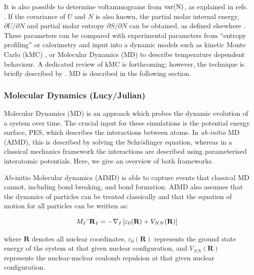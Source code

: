\documentclass[../main.tex]{subfiles}
\begin{document}
It is also possible to determine voltammograms from $\rm{var}(N)$, as explained in refs. \cite{mercer_influence_2017,darling1999}. If the covariance of $U$ and $N$ is also known, the partial molar internal energy, $\partial{U}/\partial{N}$ and partial molar entropy $\partial{S}/\partial{N}$ can be obtained, as defined elsewhere \cite{mercer_influence_2017,Kim2001h}. These parameters can be compared with experimental parameters from ``entropy profiling'' or calorimetry \cite{mercer_influence_2017,schlueter_quantifying_2018,Mercer2019,THOMAS2003844,zhang2017} and input into a dynamic models such as kinetic Monte Carlo (kMC) \cite{gavilan-arriazu_kinetic_2020,darling1999,gavilan-arriazu_effect_2020,persson2010}, or Molecular Dynamics (MD) to describe temperature dependent behaviour. A dedicated review of kMC is forthcoming; however, the technique is briefly described by \citeauthor{VanderVen2020}. \cite{VanderVen2020} MD is described in the following section.

\subsubsection{Molecular Dynamics (Lucy/Julian)}
\label{sec:molecular_dynamics}
Molecular Dynamics (MD) is an approach which probes the dynamic evolution of a system over time. The crucial input for these simulations is the potential energy surface, PES, which describes the interactions between atoms. In \textit{ab-initio} MD (AIMD), this is described by solving the Schr\"{o}dinger equation, whereas in a classical mechanics framework the interactions are described using parameterised interatomic potentials. Here, we give an overview of both frameworks.

Ab-initio Molecular dynamics (AIMD) is able to capture events that classical MD cannot, including bond breaking, and bond formation. AIMD also assumes that the dynamics of particles can be treated classically and that the equation of motion for all particles can be written as:

\begin{equation}
    \label{eq:eom}
    M_I \textrm{\"{\textbf{R}}} _I=-\nabla_I\left[ \varepsilon_0(\textbf{R})+V_{NN}(\mathbf{R})\right]
\end{equation}

where $\textbf{R}$ denotes all nuclear coordinates, $\varepsilon_0(\textbf{R})$ represents the ground state energy of the system at that given nuclear configuration, and $V_{NN}(\textbf{R})$ represents the nuclear-nuclear coulomb repulsion at that given nuclear configuration. 
\end{document}
